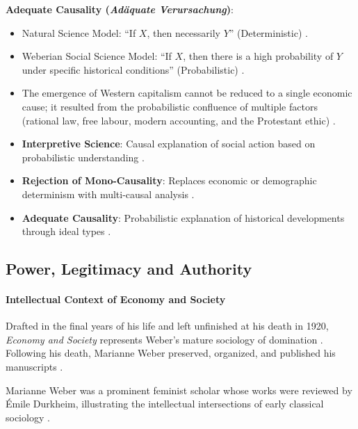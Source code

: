 \begin{KeyConcept}
\textbf{Adequate Causality (\textit{Ad\"aquate Verursachung})}:
\begin{itemize}
    \item Natural Science Model: ``If $X$, then necessarily $Y$'' (Deterministic) .
    \item Weberian Social Science Model: ``If $X$, then there is a high probability of $Y$ under specific historical conditions'' (Probabilistic) .
    \item The emergence of Western capitalism cannot be reduced to a single economic cause; it resulted from the probabilistic confluence of multiple factors (rational law, free labour, modern accounting, and the Protestant ethic) .
\end{itemize}
\end{KeyConcept}

\begin{QuickRevision}
\begin{itemize}
    \item \textbf{Interpretive Science}: Causal explanation of social action based on probabilistic understanding .
    \item \textbf{Rejection of Mono-Causality}: Replaces economic or demographic determinism with multi-causal analysis .
    \item \textbf{Adequate Causality}: Probabilistic explanation of historical developments through ideal types .
\end{itemize}
\end{QuickRevision}

\subsection{Power, Legitimacy and Authority}

\paragraph{Intellectual Context of Economy and Society}
Drafted in the final years of his life and left unfinished at his death in 1920, \textit{Economy and Society} represents Weber's mature sociology of domination . Following his death, Marianne Weber preserved, organized, and published his manuscripts .

\begin{DataFact}
Marianne Weber was a prominent feminist scholar whose works were reviewed by \'Emile Durkheim, illustrating the intellectual intersections of early classical sociology .
\end{DataFact}

